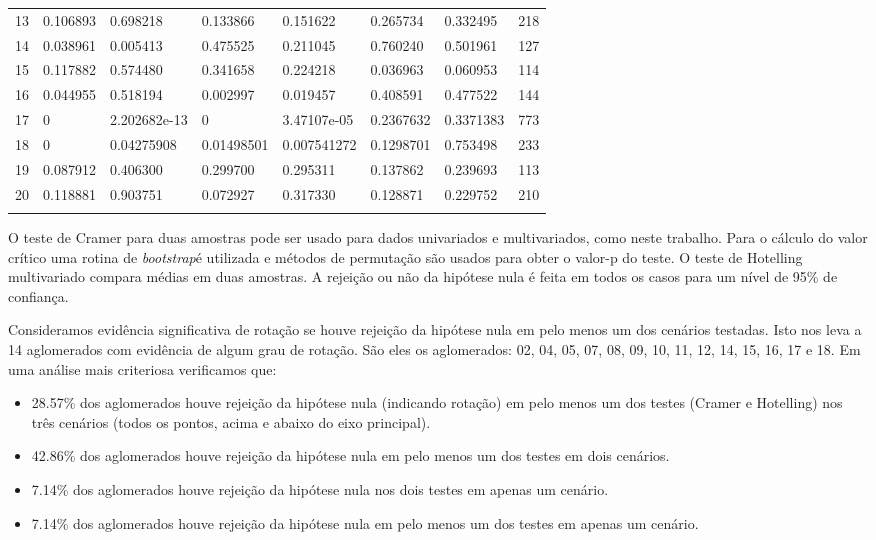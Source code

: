 \begin{table}[H]
{\begin{tabular}{llllllll}
13  &  0.106893 & 0.698218 &  0.133866 &  0.151622 & 0.265734 & 0.332495 & 218 \\ 
14  &  {\color{red}0.038961} & 0.005413 & 0.475525 &  0.211045 & 0.760240 & 0.501961 & 127 \\ 
15  &  0.117882 & 0.574480 &  0.341658 &  0.224218 & {\color{red}0.036963} & 0.060953 & 114 \\ 
16  &  {\color{red}0.044955} & 0.518194 & {\color{red}0.002997} &  {\color{red}0.019457} & 0.408591 & 0.477522 & 144  \\ 
17  &  {\color{red}0}  & {\color{red}2.202682e-13} & {\color{red}0} &  3.47107e-05 & 0.2367632 & 0.3371383 & 773 \\ 
18  &  {\color{red}0} & {\color{red}0.04275908} & {\color{red}0.01498501} &  {\color{red}0.007541272} & 0.1298701 & 0.753498 & 233 \\ 
19  &  0.087912 & 0.406300 &  0.299700 &  0.295311 & 0.137862 & 0.239693 & 113 \\ 
20  &  0.118881 & 0.903751 &  0.072927 &  0.317330 & 0.128871 & 0.229752 & 210 \\ \hline
\label{tab:selec20T}
\end{tabular}
}
\end{table}

O teste de Cramer para duas amostras pode ser usado para dados univariados e multivariados, como neste trabalho. Para o cálculo do valor crítico uma rotina de \textit{bootstrap}é utilizada e métodos de permutação são usados para obter o valor-p do teste. O teste de Hotelling multivariado compara médias em duas amostras. A rejeição ou não da hipótese nula é feita em todos os casos para um nível de 95\% de confiança. 

Consideramos evidência significativa de rotação se houve rejeição da hipótese nula em pelo menos um dos cenários testadas. Isto nos leva a 14 aglomerados com evidência de algum grau de rotação. São eles os aglomerados: 02, 04, 05, 07, 08, 09, 10, 11, 12, 14, 15, 16, 17 e 18. Em uma análise mais criteriosa verificamos que:

\begin{itemize}
   	\item 28.57\% dos aglomerados houve rejeição da hipótese nula (indicando rotação) em pelo menos um dos testes (Cramer e Hotelling) nos três cenários (todos os pontos, acima e abaixo do eixo principal). 
   	\item 42.86\% dos aglomerados houve rejeição da hipótese nula em pelo menos um dos testes em dois cenários.
   	\item 7.14\% dos aglomerados houve rejeição da hipótese nula nos dois testes em apenas um cenário.
   	\item 7.14\% dos aglomerados houve rejeição da hipótese nula em pelo menos um dos testes em apenas um cenário.
 \end{itemize} 

